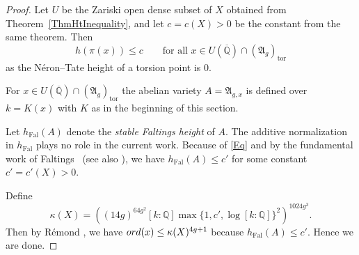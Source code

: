 \documentclass[12pt,oneside]{amsart}
\numberwithin{maincounter}{section}
\numberwithin{equation}{section}
\def\QQ{\mathbb{Q}}
\newcommand{\IQbar}{{\overline{\QQ}}}
\newcommand{\IQ}{{\QQ}}
\newcommand{\ord}[1]{{\rm ord}({#1})}
\begin{document}
\begin{proof}
Let $U$ be the Zariski open dense subset of $X$ obtained from
Theorem~\ref{ThmHtInequality}, and let $c = c(X) >0$ be the constant
from the same theorem. Then
\begin{equation}\label{Eq}
  h(\pi(x)) \le c \qquad \text{for all }x \in U(\IQbar) \cap (\mathfrak{A}_g)_{\mathrm{tor}}
\end{equation}
as the N\'eron--Tate height of a torsion point is $0$.


For $x\in U(\IQbar)\cap (\mathfrak{A}_g)_{\mathrm{tor}}$
the abelian variety $A=\mathfrak{A}_{g,x}$
is  defined over $k=K(x)$ with $K$ as in the beginning of
this section. %

Let $h_{\mathrm{Fal}}(A)$ denote the \textit{stable Faltings height} of
$A$. The additive normalization in $h_{\mathrm{Fal}}$ plays no role in
the current work. 
Because of \eqref{Eq} and
by the fundamental work of Faltings~\cite[$\mathsection 3$ including
 the proof of Lemma~3]{Faltings:ES} (see also
\cite[the remarks below Proposition~V.4.4 and Proposition~V.4.5]{FaltingsChai}), we have $h_{\mathrm{Fal}}(A) \le c'$ for some constant $c' = c'(X)>0$.%

Define
\[
\kappa(X) = ((14g)^{64g^2} [k:\IQ] \max\{1,c', \log [k:\IQ]\}^2)^{1024 g^3}.
\]
Then by R\'{e}mond   \cite[Proposition~2.9]{RemondGaloisBound}, we have $\ord{x} \le \kappa(X)^{4g+1}$ because $h_{\mathrm{Fal}}(A) \le c'$. Hence we are done.
\end{proof}









\end{document}
